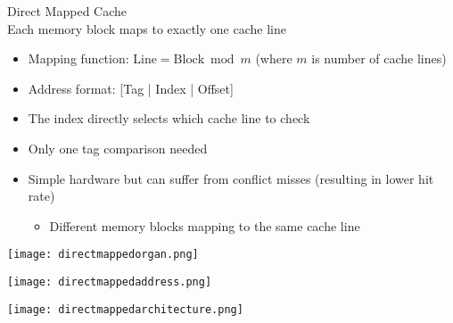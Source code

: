 \begin{concept}{Direct Mapped Cache}\\
    Each memory block maps to exactly one cache line
\begin{itemize}
    \item Mapping function: $\text{Line} = \text{Block} \bmod m$ (where $m$ is number of cache lines)
    \item Address format: [Tag | Index | Offset]
    \item The index directly selects which cache line to check
    \item Only one tag comparison needed
    \item Simple hardware but can suffer from conflict misses (resulting in lower hit rate)
    \begin{itemize}
        \item Different memory blocks mapping to the same cache line
    \end{itemize}
\end{itemize}


\begin{center}

\texttt{[image: directmappedorgan.png]}

\texttt{[image: directmappedaddress.png]}

\texttt{[image: directmappedarchitecture.png]}
\end{center}
\end{concept}



